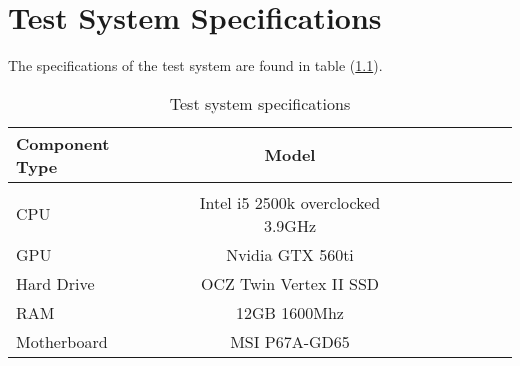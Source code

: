 
\chapter{Test System Specifications}
\label{app:testsystem}

The specifications of the test system are found in table (\ref{tab:testsystem}). 

\begin{table}[h!]
\begin{center}
\begin{tabular}{l*{6}{c}r}
Component Type            & Model  \\
\hline
\\
CPU & Intel i5 2500k overclocked \@ 3.9GHz \\
GPU & Nvidia GTX 560ti \\ 
Hard Drive & OCZ Twin Vertex II SSD \\
RAM & 12GB 1600Mhz \\
Motherboard & MSI P67A-GD65 \\
\end{tabular}

\caption{Test system specifications}
\label{tab:testsystem}
\end{center}
\end{table}